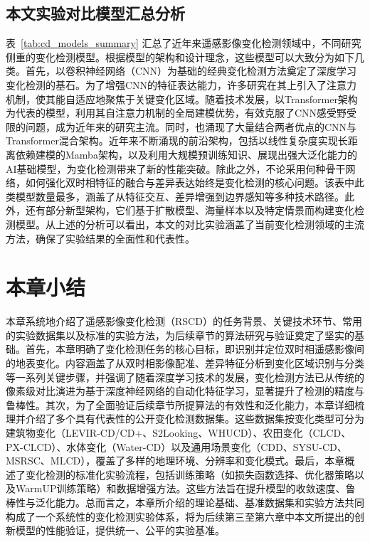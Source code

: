 \subsection{本文实验对比模型汇总分析}

表~\ref{tab:cd_models_summary} 汇总了近年来遥感影像变化检测领域中，不同研究侧重的变化检测模型。根据模型的架构和设计理念，这些模型可以大致分为如下几类。首先，以卷积神经网络（CNN）为基础的经典变化检测方法奠定了深度学习变化检测的基石。为了增强CNN的特征表达能力，许多研究在其上引入了注意力机制，使其能自适应地聚焦于关键变化区域。随着技术发展，以Transformer架构为代表的模型，利用其自注意力机制的全局建模优势，有效克服了CNN感受野受限的问题，成为近年来的研究主流。同时，也涌现了大量结合两者优点的CNN与Transformer混合架构。近年来不断涌现的前沿架构，包括以线性复杂度实现长距离依赖建模的Mamba架构，以及利用大规模预训练知识、展现出强大泛化能力的AI基础模型，为变化检测带来了新的性能突破。除此之外，不论采用何种骨干网络，如何强化双时相特征的融合与差异表达始终是变化检测的核心问题。该表中此类模型数量最多，涵盖了从特征交互、差异增强到边界感知等多种技术路径。此外，还有部分新型架构，它们基于扩散模型、海量样本以及特定情景而构建变化检测模型。从上述的分析可以看出，本文的对比实验涵盖了当前变化检测领域的主流方法，确保了实验结果的全面性和代表性。

\section{本章小结}

本章系统地介绍了遥感影像变化检测（RSCD）的任务背景、关键技术环节、常用的实验数据集以及标准的实验方法，为后续章节的算法研究与验证奠定了坚实的基础。首先，本章明确了变化检测任务的核心目标，即识别并定位双时相遥感影像间的地表变化。内容涵盖了从双时相影像配准、差异特征分析到变化区域识别与分类等一系列关键步骤，并强调了随着深度学习技术的发展，变化检测方法已从传统的像素级对比演进为基于深度神经网络的自动化特征学习，显著提升了检测的精度与鲁棒性。其次，为了全面验证后续章节所提算法的有效性和泛化能力，本章详细梳理并介绍了多个具有代表性的公开变化检测数据集。这些数据集按变化类型可分为建筑物变化（LEVIR-CD/CD+、S2Looking、WHUCD）、农田变化（CLCD、PX-CLCD）、水体变化（Water-CD）以及通用场景变化（CDD、SYSU-CD、MSRSC、MLCD），覆盖了多样的地理环境、分辨率和变化模式。最后，本章概述了变化检测的标准化实验流程，包括训练策略（如损失函数选择、优化器策略以及WarmUP训练策略）和数据增强方法。这些方法旨在提升模型的收敛速度、鲁棒性与泛化能力。总而言之，本章所介绍的理论基础、基准数据集和实验方法共同构成了一个系统性的变化检测实验体系，将为后续第三至第六章中本文所提出的创新模型的性能验证，提供统一、公平的实验基准。
